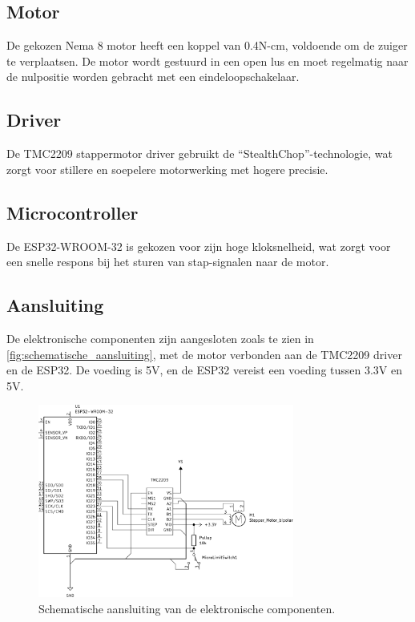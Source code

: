 \subsection{Motor}
De gekozen Nema 8 motor heeft een koppel van 0.4N-cm, voldoende om de zuiger te verplaatsen. De motor wordt gestuurd in een open lus en moet regelmatig naar de nulpositie worden gebracht met een eindeloopschakelaar.

\subsection{Driver}
De TMC2209 stappermotor driver gebruikt de ``StealthChop''-technologie, wat zorgt voor stillere en soepelere motorwerking met hogere precisie.

\subsection{Microcontroller}
De ESP32-WROOM-32 is gekozen voor zijn hoge kloksnelheid, wat zorgt voor een snelle respons bij het sturen van stap-signalen naar de motor.

\subsection{Aansluiting}
De elektronische componenten zijn aangesloten zoals te zien in \autoref{fig:schematische_aansluiting}, met de motor verbonden aan de TMC2209 driver en de ESP32. De voeding is 5V, en de ESP32 vereist een voeding tussen 3.3V en 5V.

\begin{figure}[H] 
    \centering 
    \includegraphics[width=0.75\textwidth]{figures/Wiring_BW.png} 
    \caption{Schematische aansluiting van de elektronische componenten.}\label{fig:schematische_aansluiting} 
\end{figure}


